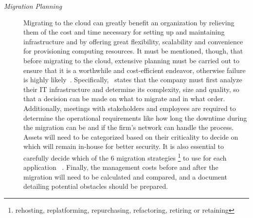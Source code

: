\begin{description}
    \item[\textit{Migration Planning}] Migrating to the cloud can greatly benefit an organization by relieving them of the cost and time necessary for setting up and maintaining infrastructure and by offering great flexibility, scalability and convenience for provisioning computing resources. It must be mentioned, though, that before migrating to the cloud, extensive planning must be carried out to ensure that it is a worthwhile and cost-efficient endeavor, otherwise failure is highly likely~\cite{cloud-failure}. Specifically,~\cite{migration-planning} states that the company must first analyze their IT infrastructure and determine its complexity, size and quality, so that a decision can be made on what to migrate and in what order. Additionally, meetings with stakeholders and employees are required to determine the operational requirements like how long the downtime during the migration can be and if the firm's network can handle the process. Assets will need to be categorized based on their criticality to decide on which will remain in-house for better security. It is also essential to carefully decide which of the 6 migration strategies \footnote{rehosting, replatforming, repurchasing, refactoring, retiring or retaining} to use for each application ~\cite{6rs}. Finally, the management costs before and after the migration will need to be calculated and compared, and a document detailing potential obstacles should be prepared.
\end{description}
